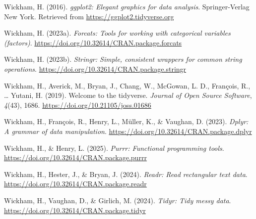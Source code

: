 \documentclass[
  ,man,floatsintext]{apa6}
\newlength{\cslhangindent}
\newenvironment{CSLReferences}[2] %
 {\begin{list}{}{%
  \setlength{\itemindent}{0pt}
  \setlength{\leftmargin}{0pt}
  \setlength{\parsep}{0pt}
  \ifodd #1
   \setlength{\leftmargin}{\cslhangindent}
   \setlength{\itemindent}{-1\cslhangindent}
  \fi
  \setlength{\itemsep}{#2\baselineskip}}}
 {\end{list}}
\begin{document}
\begin{CSLReferences}{1}{0}
Wickham, H. (2016). \emph{ggplot2: Elegant graphics for data analysis}. Springer-Verlag New York. Retrieved from \url{https://ggplot2.tidyverse.org}

Wickham, H. (2023a). \emph{Forcats: Tools for working with categorical variables (factors)}. \url{https://doi.org/10.32614/CRAN.package.forcats}

Wickham, H. (2023b). \emph{Stringr: Simple, consistent wrappers for common string operations}. \url{https://doi.org/10.32614/CRAN.package.stringr}

Wickham, H., Averick, M., Bryan, J., Chang, W., McGowan, L. D., François, R., \ldots{} Yutani, H. (2019). Welcome to the {tidyverse}. \emph{Journal of Open Source Software}, \emph{4}(43), 1686. \url{https://doi.org/10.21105/joss.01686}

Wickham, H., François, R., Henry, L., Müller, K., \& Vaughan, D. (2023). \emph{Dplyr: A grammar of data manipulation}. \url{https://doi.org/10.32614/CRAN.package.dplyr}

Wickham, H., \& Henry, L. (2025). \emph{Purrr: Functional programming tools}. \url{https://doi.org/10.32614/CRAN.package.purrr}

Wickham, H., Hester, J., \& Bryan, J. (2024). \emph{Readr: Read rectangular text data}. \url{https://doi.org/10.32614/CRAN.package.readr}

Wickham, H., Vaughan, D., \& Girlich, M. (2024). \emph{Tidyr: Tidy messy data}. \url{https://doi.org/10.32614/CRAN.package.tidyr}

\end{CSLReferences}


\clearpage
\renewcommand{\listfigurename}{Figure captions}

\clearpage
\renewcommand{\listtablename}{Table captions}
\end{document}
